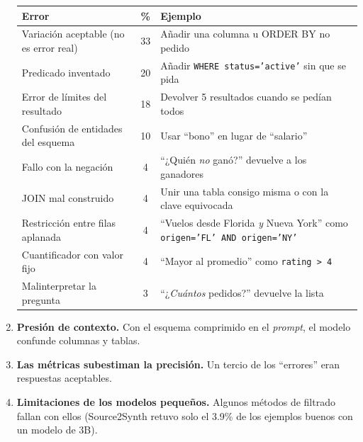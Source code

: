 \documentclass[11pt,a4paper]{article}
\begin{document}
\begin{enumerate}
  \begin{center}
  \small
  \begin{tabularx}{\linewidth}{@{}l c X@{}}
    \toprule
    \textbf{Error} & \textbf{\%} & \textbf{Ejemplo} \\
    \midrule
    Variación aceptable (no es error real) & 33 & Añadir una columna u ORDER BY no pedido \\
    Predicado inventado & 20 & Añadir \texttt{WHERE status='active'} sin que se pida \\
    Error de límites del resultado & 18 & Devolver 5 resultados cuando se pedían todos \\
    Confusión de entidades del esquema & 10 & Usar ``bono'' en lugar de ``salario'' \\
    Fallo con la negación & 4 & ``¿Quién \textit{no} ganó?'' devuelve a los ganadores \\
    JOIN mal construido & 4 & Unir una tabla consigo misma o con la clave equivocada \\
    Restricción entre filas aplanada & 4 & ``Vuelos desde Florida \textit{y} Nueva York'' como \texttt{origen='FL' AND origen='NY'} \\
    Cuantificador con valor fijo & 4 & ``Mayor al promedio'' como \texttt{rating > 4} \\
    Malinterpretar la pregunta & 3 & ``¿\textit{Cuántos} pedidos?'' devuelve la lista \\
    \bottomrule
  \end{tabularx}
  \end{center}
  \item \textbf{Presión de contexto.} Con el esquema comprimido en el \textit{prompt}, el modelo confunde columnas y tablas.
  \item \textbf{Las métricas subestiman la precisión.} Un tercio de los ``errores'' eran respuestas aceptables.
  \item \textbf{Limitaciones de los modelos pequeños.} Algunos métodos de filtrado fallan con ellos (Source2Synth retuvo solo el 3.9\% de los ejemplos buenos con un modelo de 3B).
\end{enumerate}

\end{document}
